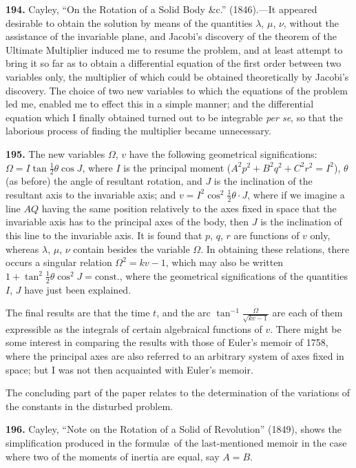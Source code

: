 \documentclass[11pt,a4paper]{book}
\begin{document}
\textbf{194.} Cayley, ``On the Rotation of a Solid Body \&c.'' (1846).---It appeared desirable to obtain the solution by means of the quantities $\lambda$, $\mu$, $\nu$, without the assistance of the invariable plane, and Jacobi's discovery of the theorem of the Ultimate Multiplier induced me to resume the problem, and at least attempt to bring it so far as to obtain a differential equation of the first order between two variables only, the multiplier of which could be obtained theoretically by Jacobi's discovery. The choice of two new variables to which the equations of the problem led me, enabled me to effect this in a simple manner; and the differential equation which I finally obtained turned out to be integrable \textit{per se}, so that the laborious process of finding the multiplier became unnecessary.

\textbf{195.} The new variables $\Omega$, $v$ have the following geometrical significations: $\Omega = I\tan\frac{1}{2}\theta\cos J$, where $I$ is the principal moment ($A^2p^2 + B^2q^2 + C^2r^2 = I^2$), $\theta$ (as before) the angle of resultant rotation, and $J$ is the inclination of the resultant axis to the invariable axis; and $v = I^2\cos^2\frac{1}{2}\theta \cdot J$, where if we imagine a line $AQ$ having the same position relatively to the axes fixed in space that the invariable axis has to the principal axes of the body, then $J$ is the inclination of this line to the invariable axis. It is found that $p$, $q$, $r$ are functions of $v$ only, whereas $\lambda$, $\mu$, $\nu$ contain besides the variable $\Omega$. In obtaining these relations, there occurs a singular relation $\Omega^2 = kv - 1$, which may also be written $1 + \tan^2\frac{1}{2}\theta\cos^2 J = \text{const.}$, where the geometrical significations of the quantities $I$, $J$ have just been explained.

The final results are that the time $t$, and the arc $\tan^{-1}\frac{\Omega}{\sqrt{kv - 1}}$ are each of them expressible as the integrals of certain algebraical functions of $v$. There might be some interest in comparing the results with those of Euler's memoir of 1758, where the principal axes are also referred to an arbitrary system of axes fixed in space; but I was not then acquainted with Euler's memoir.

The concluding part of the paper relates to the determination of the variations of the constants in the disturbed problem.

\textbf{196.} Cayley, ``Note on the Rotation of a Solid of Revolution'' (1849), shows the simplification produced in the formul\ae\ of the last-mentioned memoir in the case where two of the moments of inertia are equal, say $A = B$.
\end{document}
